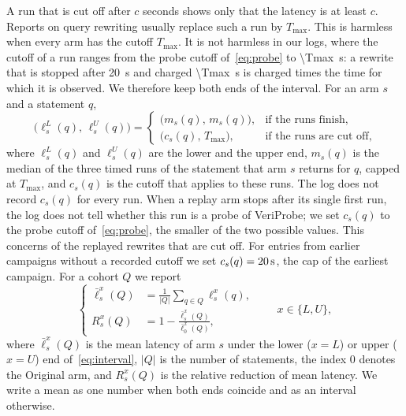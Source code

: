 \documentclass[conference]{IEEEtran}
\newcommand{\sys}{VeriProbe}
\begin{document}
A run that is cut off after $c$ seconds shows only that the latency is at least $c$.
Reports on query rewriting usually replace such a run by $T_{\max}$.
This is harmless when every arm has the cutoff $T_{\max}$.
It is not harmless in our logs, where the cutoff of a run ranges from the probe cutoff of~\eqref{eq:probe} to \SI{\Tmax}{\second}: a rewrite that is stopped after \SI{20}{\second} and charged \SI{\Tmax}{\second} is charged \PenaltyFactor{} times the time for which it is observed.
We therefore keep both ends of the interval.
For an arm $s$ and a statement $q$,
\begin{equation}
\bigl(\ell^{L}_{s}(q),\, \ell^{U}_{s}(q)\bigr) =
\begin{cases}
\bigl(m_{s}(q),\, m_{s}(q)\bigr), & \text{if the runs finish},\\
\bigl(c_{s}(q),\, T_{\max}\bigr), & \text{if the runs are cut off},
\end{cases}
\label{eq:interval}
\end{equation}
where $\ell^{L}_{s}(q)$ and $\ell^{U}_{s}(q)$ are the lower and the upper end, $m_{s}(q)$ is the median of the three timed runs of the statement that arm $s$ returns for $q$, capped at $T_{\max}$, and $c_{s}(q)$ is the cutoff that applies to these runs.
The log does not record $c_{s}(q)$ for every run.
When a replay arm stops after its single first run, the log does not tell whether this run is a probe of \sys{}; we set $c_{s}(q)$ to the probe cutoff of~\eqref{eq:probe}, the smaller of the two possible values.
This concerns \AllReplayProbeCut{} of the \AllReplayCutOff{} replayed rewrites that are cut off.
For entries from earlier campaigns without a recorded cutoff we set $c_{s}(q) = \SI{20}{\second}$, the cap of the earliest campaign.
For a cohort $Q$ we report
\begin{equation}
\left\{
\begin{aligned}
\bar{\ell}^{x}_{s}(Q) &= \frac{1}{|Q|} \sum_{q \in Q} \ell^{x}_{s}(q),\\
R^{x}_{s}(Q) &= 1 - \frac{\bar{\ell}^{x}_{s}(Q)}{\bar{\ell}^{x}_{0}(Q)},
\end{aligned}
\right.
\qquad x \in \{L, U\},
\label{eq:mean}
\end{equation}
where $\bar{\ell}^{x}_{s}(Q)$ is the mean latency of arm $s$ under the lower ($x = L$) or upper ($x = U$) end of~\eqref{eq:interval}, $|Q|$ is the number of statements, the index 0 denotes the Original arm, and $R^{x}_{s}(Q)$ is the relative reduction of mean latency.
We write a mean as one number when both ends coincide and as an interval otherwise.
\end{document}

